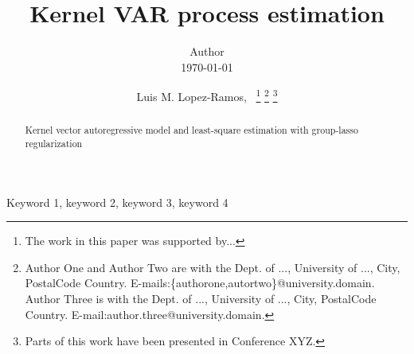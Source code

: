 \documentclass[10pt,final,onecolumn]{IEEEtran}
\begin{document}
\title{Kernel VAR process estimation}

\if{}
  \author{Author\\[.5cm]\today}
\else
\author{Luis M. Lopez-Ramos,~
\thanks{The work in this paper was supported by...
 }
\thanks{Author One and Author Two  are with the Dept. of ...,
  University of ..., City, PostalCode
  Country. E-mails:\{authorone,autortwo\}@university.domain.
Author Three is with the Dept. of ...,
  University of ..., City, PostalCode
  Country. E-mail:author.three@university.domain.}
\thanks{Parts of this work have been presented in Conference XYZ.}
}
\fi

\maketitle
\begin{abstract}
Kernel vector autoregressive model and least-square estimation with group-lasso regularization
\end{abstract}

\if{}
\begin{keywords}
Keyword 1, keyword 2, keyword 3, keyword 4
\end{keywords}
\fi
\end{document}
